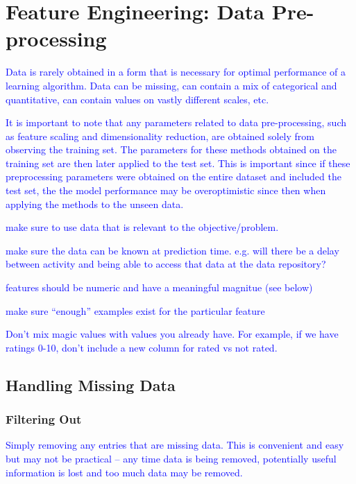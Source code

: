 \section{Feature Engineering: Data Pre-processing}

\textcolor{blue}{Data is rarely obtained in a form that is necessary for optimal performance of a learning algorithm. Data can be missing, can contain a mix of categorical and quantitative, can contain values on vastly different scales, etc.}

\textcolor{blue}{It is important to note that any parameters related to data pre-processing, such as feature scaling and dimensionality reduction, are obtained solely from observing the training set. The parameters for these methods obtained on the training set are then later applied to the test set. This is important since if these preprocessing parameters were obtained on the entire dataset and included the test set, the the model performance may be overoptimistic since then when applying the methods to the unseen data.}

\textcolor{blue}{make sure to use data that is relevant to the objective/problem.}


\textcolor{blue}{make sure the data can be known at prediction time. e.g. will there be a delay between activity and being able to access that data at the data repository?}


\textcolor{blue}{features should be numeric and have a meaningful magnitue (see below)}


\textcolor{blue}{make sure ``enough'' examples exist for the particular feature}

\textcolor{blue}{Don't mix magic values with values you already have. For example, if we have ratings 0-10, don't include a new column for rated vs not rated.}

\subsection{Handling Missing Data}

\subsubsection{Filtering Out}

\textcolor{blue}{Simply removing any entries that are missing data. This is convenient and easy but may not be practical -- any time data is being removed, potentially useful information is lost and too much data may be removed.}

